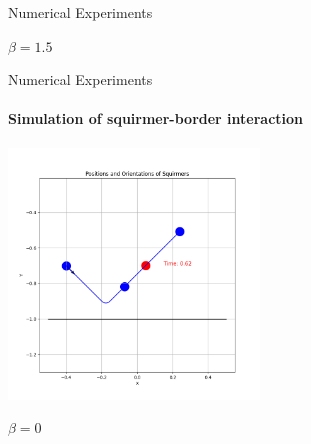 \documentclass{beamer}
\begin{document}
\begin{frame}{Numerical Experiments}
\begin{minipage}{0.49\textwidth}
        $\beta = 1.5$
    \end{minipage}
\end{frame}

\begin{frame}{Numerical Experiments}
    \framesubtitle{Simulation of squirmer-border interaction}
    \centering
    \includegraphics[width=0.5\textwidth]{../../graphs/simulations/border/beta0/mpi_4.png}
    \begin{center}
        $\beta = 0$
    \end{center}
\end{frame}
\end{document}
